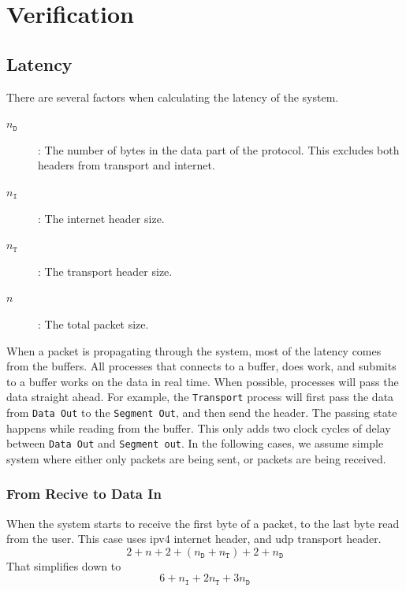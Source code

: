 \section{Verification}
\subsection{Latency}\label{subsec:latency}
There are several factors when calculating the latency of the system.
\begin{description}
    \item[$n_{\mathtt{D}}$]:\quad
    The number of bytes in the data part of the protocol. This excludes both
    headers from transport and internet.
    \item[$n_{\mathtt{I}}$]:\quad
    The internet header size.
    \item[$n_{\mathtt{T}}$]:\quad
    The transport header size.
    \item[$n$]:\quad
    The total packet size.
\end{description}
When a packet is propagating through the system, most
of the latency comes from the buffers. All processes that connects
to a buffer, does work, and submits to a buffer works on the data in real time.
When possible, processes will pass the data straight ahead. For example, the
\texttt{Transport} process will first pass the data from \texttt{Data Out} to
the \texttt{Segment Out}, and then send the header. The passing state happens
while reading from the buffer. This only adds two clock cycles of delay between
\texttt{Data Out} and \texttt{Segment out}.
In the following cases, we assume simple system where either only packets are
being sent, or packets are being received.

\subsubsection{From Recive to Data In}
When the system starts to receive the first byte of a packet, to the last byte read from
the user. This case uses \gls{ipv4} internet header, and \gls{udp} transport
header.
\begin{equation*}
    2 + n + 2 + (n_{\mathtt{D}} + n_{\mathtt{T}}) + 2 + n_{\mathtt{D}}
\end{equation*}
That simplifies down to
\begin{equation} \label{eq:receive_to_datain}
     6 + n_{\mathtt{I}} + 2n_{\mathtt{T}} + 3n_{\mathtt{D}}
\end{equation}
